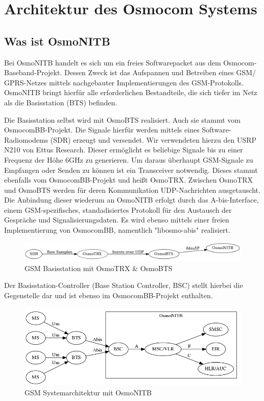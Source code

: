 \section{Architektur des Osmocom Systems}


\subsection{Was ist OsmoNITB}
Bei OsmoNITB handelt es sich um ein freies Softwarepacket aus dem Osmocom-Baseband-Projekt. Dessen Zweck ist das Aufspannen und Betreiben eines GSM/ GPRS-Netzes mittels nachgebauter Implementierungen des GSM-Protokolls. OsmoNITB bringt hierfür alle erforderlichen Bestandteile, die sich tiefer im Netz als die Basisstation (BTS) befinden. 

Die Basisstation selbst wird mit OsmoBTS realisiert. Auch sie stammt vom OsmocomBB-Projekt. Die Signale hierfür werden mittels eines Software-Radiomodems (SDR) erzeugt und versendet. Wir verwendeten hierzu den USRP N210 von Ettus Research. Dieser ermöglicht es beliebige Signale bis zu einer Frequenz der Höhe 6GHz zu generieren. Um daraus überhaupt GSM-Signale zu Empfangen oder Senden zu können ist ein Transceiver notwendig. Dieses stammt ebenfalls vom OsmocomBB-Projekt und heißt OsmoTRX. Zwischen OsmoTRX und OsmoBTS werden für deren Kommunikation UDP-Nachrichten ausgetauscht. Die Anbindung dieser wiederum an OsmoNITB erfolgt durch das A-bis-Interface, einem GSM-spezifisches, standadisiertes Protokoll für den Austausch der Gespräche und Signalisierungsdaten. Es wird ebenso mittels einer freien Implementierung von OsmocomBB, namentlich "libosmo-abis" realisiert.  


\begin{figure}[h]
    \centering
    \includegraphics[width=15cm]{includes/osmotrx}
    \caption{GSM Basisstation mit OsmoTRX \& OsmoBTS}
	\label{fig:osmotrx}
\end{figure}


Der Basisstation-Controller (Base Station Controller, BSC) stellt hierbei die Gegenstelle dar und ist ebenso im OsmocomBB-Projekt enthalten. 




\begin{figure}[h]
    \centering
    \includegraphics[width=15cm]{includes/osmonitb}
    \caption{GSM Systemarchitektur mit OsmoNITB}
	\label{fig:osmonitb}
\end{figure}



